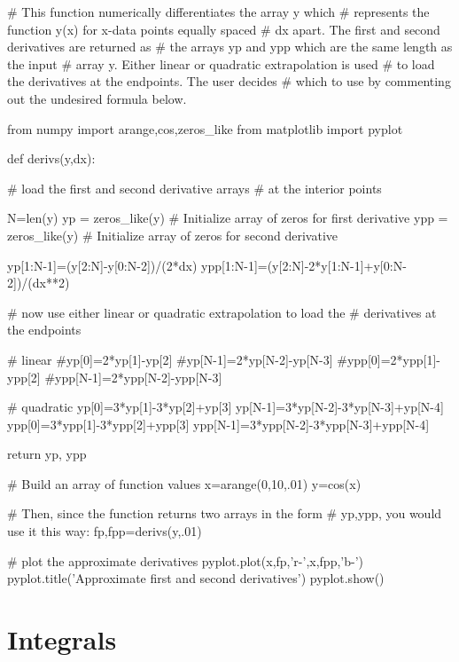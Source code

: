 \begin{codeexample}[derivs.py]
\begin{VerbatimOut}{\listingFile}

# This function numerically differentiates the array y which
# represents the function y(x) for x-data points equally spaced
# dx apart.  The first and second derivatives are returned as
# the arrays yp and ypp which are the same length as the input
# array y.  Either linear or quadratic extrapolation is used
# to load the derivatives at the endpoints.  The user decides
# which to use by commenting out the undesired formula below.

from numpy import arange,cos,zeros_like
from matplotlib import pyplot

def derivs(y,dx):

    # load the first and second derivative arrays
    # at the interior points

    N=len(y)
    yp = zeros_like(y)  # Initialize array of zeros for first derivative
    ypp = zeros_like(y)  # Initialize array of zeros for second derivative

    yp[1:N-1]=(y[2:N]-y[0:N-2])/(2*dx)
    ypp[1:N-1]=(y[2:N]-2*y[1:N-1]+y[0:N-2])/(dx**2)

    # now use either linear or quadratic extrapolation to load the
    # derivatives at the endpoints


    # linear
    #yp[0]=2*yp[1]-yp[2]
    #yp[N-1]=2*yp[N-2]-yp[N-3]
    #ypp[0]=2*ypp[1]-ypp[2]
    #ypp[N-1]=2*ypp[N-2]-ypp[N-3]

    # quadratic
    yp[0]=3*yp[1]-3*yp[2]+yp[3]
    yp[N-1]=3*yp[N-2]-3*yp[N-3]+yp[N-4]
    ypp[0]=3*ypp[1]-3*ypp[2]+ypp[3]
    ypp[N-1]=3*ypp[N-2]-3*ypp[N-3]+ypp[N-4]

    return yp, ypp


# Build an array of function values
x=arange(0,10,.01)
y=cos(x)

# Then, since the function returns two arrays in the form
# yp,ypp, you would use it this way:
fp,fpp=derivs(y,.01)

# plot the approximate derivatives
pyplot.plot(x,fp,'r-',x,fpp,'b-')
pyplot.title('Approximate first and second derivatives')
pyplot.show()
\end{VerbatimOut}
\end{codeexample}

\section{Integrals}

